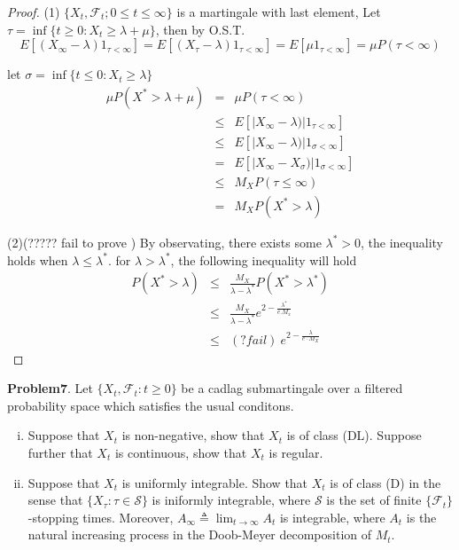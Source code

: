\documentclass{article}     %
\begin{document}
\begin{proof}
(1) $\{X_t,\mathcal{F}_t;0\leq t\leq \infty\}$ is a martingale with last element, Let $\tau = \inf \{t\geq 0:X_t\geq \lambda+\mu\}$, then by O.S.T.
\[E[(X_{\infty}-\lambda) 1_{\tau<\infty}]=E[(X_{\tau}-\lambda) 1_{\tau<\infty}]=E[\mu 1_{\tau <\infty}]=\mu P(\tau<\infty)\]

let $\sigma=\inf\{t\leq 0: X_t\geq \lambda\}$
\begin{eqnarray*}
\mu P(X^*>\lambda+\mu) & = & \mu P(\tau<\infty)\\ 
& \leq &  E[|X_{\infty}-\lambda)|1_{\tau<\infty}]\\ 
& \leq &  E[|X_{\infty}-\lambda)|1_{\sigma<\infty}]\\ 
& =&  E[|X_{\infty}-X_{\sigma})|1_{\sigma<\infty}]\\
& \leq & M_XP(\tau\leq \infty)\\ 
& = & M_X P(X^*>\lambda)
\end{eqnarray*}





(2)(????? fail to prove ) By observating, there exists some $\lambda^*>0$, the inequality holds when $\lambda \leq \lambda^* $.  
for $\lambda>\lambda^*$, the following inequality will hold
\begin{eqnarray*}
P(X^*>\lambda) & \leq &\frac{M_X}{\lambda-\lambda^*}P(X^*>\lambda^*)\\
& \leq  & \frac{M_X}{\lambda-\lambda^*}e^{2-\frac{\lambda^*}{e.M_x}}\\
& \leq &(? fail )~ e^{2-\frac{\lambda}{e\cdot M_X}}
\end{eqnarray*}














\end{proof}

\noindent
\textbf{Problem7}. Let $\{X_t,\mathcal{F}_t:t\geq 0\}$ be a cadlag submartingale over a filtered probability space which satisfies the usual conditons.

\begin{enumerate}[(i)]
    \item  Suppose that $X_t$ is non-negative, show that $X_t$ is of class (DL). Suppose further that $X_t$ is continuous, show that $X_t$ is regular.
    \item  Suppose that $X_t$ is uniformly integrable. Show that $X_t$ is of class (D) in the sense that $\{X_{\tau}:\tau \in \mathcal{S}\}$ is iniformly integrable, where $\mathcal{S}$ is the set of finite $\{\mathcal{F}_t\}$-stopping times. Moreover, $A_{\infty} \triangleq \lim_{t\rightarrow \infty }A_t$ is integrable, where $A_t$ is the natural increasing process in the Doob-Meyer decomposition of $M_t$.
\end{enumerate}
\end{document}
